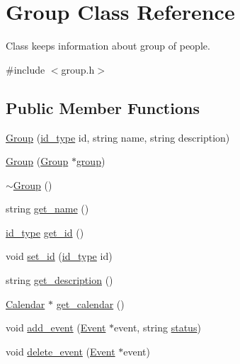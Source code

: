 \hypertarget{classGroup}{
\section{Group Class Reference}
\label{d0/db7/classGroup}
}


Class keeps information about group of people.  




{\ttfamily \#include $<$group.h$>$}

\subsection*{Public Member Functions}
\begin{DoxyCompactItemize}
\item 
\hyperlink{classGroup_ae2cf7fd2aae55c47454fa3072ccc45f1}{Group} (\hyperlink{types_8h_a0b60c08a3ab1435cccc5643d32d8ccee}{id\_\-type} id, string name, string description)
\item 
\hyperlink{classGroup_a4b68e3ee36ef3270af3ecfae4b043c4c}{Group} (\hyperlink{classGroup}{Group} $\ast$\hyperlink{group__content_8h_a27517aa1480ab2d9bfe5d62e693b33eb}{group})
\item 
\hyperlink{classGroup_aed00a22ff227ee2657ae44a5cbcedf7c}{$\sim$Group} ()
\item 
string \hyperlink{classGroup_aab2e4ec29eda3a490dede01eb9411f03}{get\_\-name} ()
\item 
\hyperlink{types_8h_a0b60c08a3ab1435cccc5643d32d8ccee}{id\_\-type} \hyperlink{classGroup_abdd86767799c3c3b6d2f7204b1945bd3}{get\_\-id} ()
\item 
void \hyperlink{classGroup_a1b7657c13a5cad2a8ad931c8fed8ecfb}{set\_\-id} (\hyperlink{types_8h_a0b60c08a3ab1435cccc5643d32d8ccee}{id\_\-type} id)
\item 
string \hyperlink{classGroup_ade4eb90fbeb5f50dfb2ccb262cd39ce8}{get\_\-description} ()
\item 
\hyperlink{classCalendar}{Calendar} $\ast$ \hyperlink{classGroup_a10f85a428de5c1215fd7d319bd1a9ca3}{get\_\-calendar} ()
\item 
void \hyperlink{classGroup_abea5d93d27820a64c84792e3011f1394}{add\_\-event} (\hyperlink{classEvent}{Event} $\ast$event, string \hyperlink{group__content_8h_ab4d38e7365d935f2a5f1403eec29127e}{status})
\item 
void \hyperlink{classGroup_a70b5f6f47818f5d4912926b29faa96bf}{delete\_\-event} (\hyperlink{classEvent}{Event} $\ast$event)
\item 

\end{DoxyCompactItemize}
